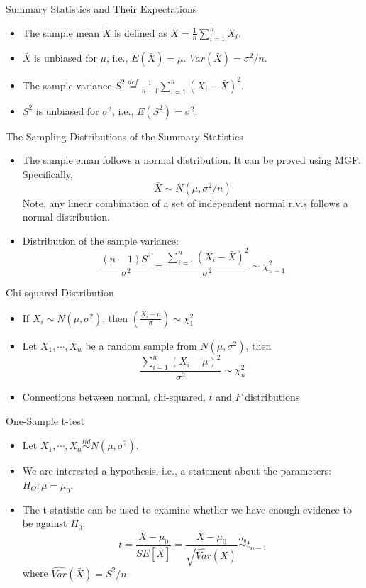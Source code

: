 \documentclass[landscape]{slides}
\begin{document}
\begin{slide}{\Large Summary Statistics and Their Expectations}
\begin{itemize}
    \item The sample mean $\bar X$ is defined as $\bar X=\frac{1}{n}\sum_{i=1}^n X_i$.
    \item $\bar X$ is unbiased for $\mu$, i.e., $E(\bar X)=\mu$. $Var(\bar X)=\sigma^2/n$.
    \item The sample variance $S^2\overset{def}=\frac{1}{n-1}\sum_{i=1}^n (X_i-\bar X)^2$. 
    \item $S^2$ is unbiased for $\sigma^2$, i.e., $E(S^2)=\sigma^2$.
\end{itemize}
\end{slide}

\begin{slide}{\Large The Sampling Distributions of the Summary Statistics}
\begin{itemize}
    \item The sample eman follows a normal distribution. It can be proved using MGF. Specifically,
    $$\bar X \sim N(\mu, \sigma^2/n)$$
    Note, any linear combination of a set of independent normal r.v.s follows a normal distribution.
    \item Distribution of the sample variance:
    $$\frac{(n-1)S^2}{\sigma^2}= \frac{\sum_{i=1}^n (X_i-\bar X)^2}{\sigma^2} \sim \chi_{n-1}^2$$
\end{itemize}
\end{slide}

\begin{slide}{\Large Chi-squared Distribution}
\begin{itemize}
    \item If $X_i\sim N(\mu,\sigma^2)$, then $\left(\frac{X_i-\mu}{\sigma}\right)\sim \chi_1^2$
    \item Let $X_1,\cdots,X_n$ be a random sample from $N(\mu,\sigma^2)$, then $$\frac{\sum_{i=1}^n (X_i-\mu)^2}{\sigma^2}\sim \chi_n^2$$
    \item Connections between normal, chi-squared, $t$ and $F$ distributions
\end{itemize}
\end{slide}

\begin{slide}{\Large One-Sample t-test}
\begin{itemize}
    \item Let $X_1,\cdots,X_n\overset{iid}\sim N(\mu,\sigma^2)$.
    \item We are interested a hypothesis, i.e., a statement about the parameters: $H_O: \mu=\mu_0$.
    \item The t-statistic can be used to examine whether we have enough evidence to be against $H_0$:
    $$t=\frac{\bar X - \mu_0}{SE[\bar X]}=\frac{\bar X - \mu_0}{\sqrt{ \hat{Var}(\bar X)}} \overset{H_0}\sim t_{n-1}$$
    where $\hat{Var}(\bar X)=S^2/n$
\end{itemize}
\end{slide}
\end{document}
